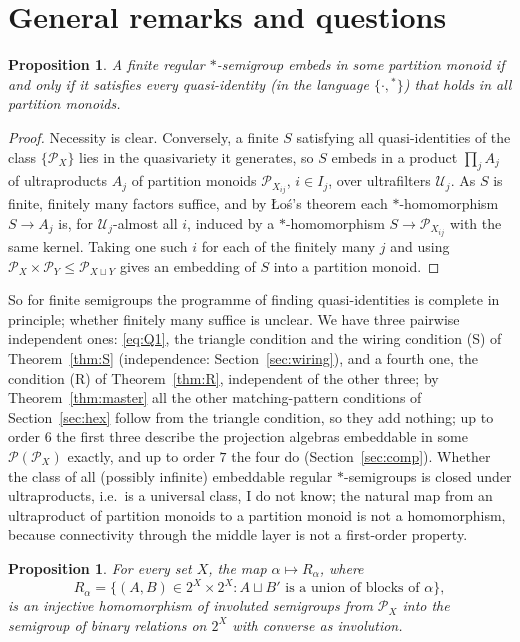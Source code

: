 \documentclass[11pt]{amsart}
\newtheorem{proposition}[theorem]{Proposition}
\theoremstyle{definition}
\renewcommand{\P}{\mathcal{P}}
\begin{document}
\section{General remarks and questions}\label{sec:general}

\begin{proposition}\label{prop:finite}
A finite regular $*$-semigroup embeds in some partition monoid if and only if it satisfies every quasi-identity (in the language $\{\cdot,{}^*\}$) that holds in all partition monoids.
\end{proposition}

\begin{proof}
Necessity is clear. Conversely, a finite $S$ satisfying all quasi-identities of the class $\{\P_X\}$ lies in the quasivariety it generates, so $S$ embeds in a product $\prod_j A_j$ of ultraproducts $A_j$ of partition monoids $\P_{X_{ij}}$, $i\in I_j$, over ultrafilters $\mathcal U_j$. As $S$ is finite, finitely many factors suffice, and by \L o\'s's theorem each $*$-homomorphism $S\to A_j$ is, for $\mathcal U_j$-almost all $i$, induced by a $*$-homomorphism $S\to\P_{X_{ij}}$ with the same kernel. Taking one such $i$ for each of the finitely many $j$ and using $\P_X\times\P_Y\le\P_{X\sqcup Y}$ gives an embedding of $S$ into a partition monoid.
\end{proof}

So for finite semigroups the programme of finding quasi-identities is complete in principle; whether finitely many suffice is unclear. We have three pairwise independent ones: \eqref{eq:Q1}, the triangle condition and the wiring condition (S) of Theorem~\ref{thm:S} (independence: Section~\ref{sec:wiring}), and a fourth one, the condition (R) of Theorem~\ref{thm:R}, independent of the other three; by Theorem~\ref{thm:master} all the other matching-pattern conditions of Section~\ref{sec:hex} follow from the triangle condition, so they add nothing; up to order $6$ the first three describe the projection algebras embeddable in some $\P(\P_X)$ exactly, and up to order $7$ the four do (Section~\ref{sec:comp}). Whether the class of all (possibly infinite) embeddable regular $*$-semigroups is closed under ultraproducts, i.e.\ is a universal class, I do not know; the natural map from an ultraproduct of partition monoids to a partition monoid is not a homomorphism, because connectivity through the middle layer is not a first-order property.

\begin{proposition}\label{prop:relations}
For every set $X$, the map $\alpha\mapsto R_\alpha$, where
\[
R_\alpha=\{(A,B)\in 2^X\times2^X: A\sqcup B'\text{ is a union of blocks of }\alpha\},
\]
is an injective homomorphism of involuted semigroups from $\P_X$ into the semigroup of binary relations on $2^X$ with converse as involution.
\end{proposition}
\end{document}
